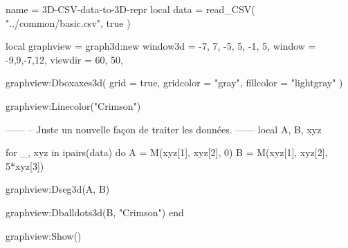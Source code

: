 \documentclass{standalone}
\begin{document}
\begin{luadraw}{name = 3D-CSV-data-to-3D-repr}
local data = read_CSV(
  "../common/basic.csv",
  true
)

local graphview = graph3d:new{
  window3d = {-7, 7, -5, 5, -1, 5},
  window   = {-9,9,-7,12},
  viewdir  = {60, 50},
}

graphview:Dboxaxes3d({
  grid      = true,
  gridcolor = "gray",
  fillcolor = "lightgray"
})

graphview:Linecolor("Crimson")

------
-- Juste un nouvelle façon de traiter les données.
------
local A, B, xyz

for _, xyz in ipairs(data) do
  A = M(xyz[1], xyz[2], 0)
  B = M(xyz[1], xyz[2], 5*xyz[3])

  graphview:Dseg3d({A, B})

  graphview:Dballdots3d({B}, "Crimson")
end

graphview:Show()
\end{luadraw}
\end{document}
